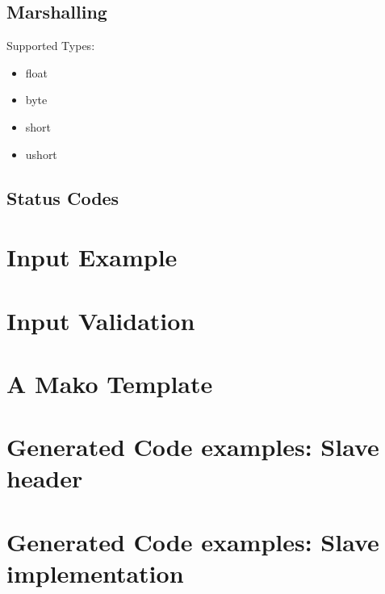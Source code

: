 \documentclass[a4paper,pdftex]{paper}
\begin{document}
\subsection{Marshalling}

Supported Types:

\begin{itemize}
\item float
\item byte
\item short
\item ushort
\end{itemize}

\subsection{Status Codes}

\appendix{}
\section{Input Example}



\section{Input Validation}
\label{sec:app_input_xsd}



\section{A Mako Template}
\label{sec:mako_gen_avr_impl}





\section{Generated Code examples: Slave header}
\label{sec:gen_out}



\section{Generated Code examples: Slave implementation}
\end{document}
